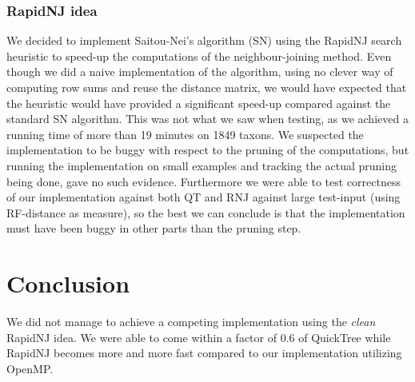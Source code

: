 \documentclass[a4paper,oneside,article,11pt]{memoir}
\begin{document}
\subsection*{RapidNJ idea}
We decided to implement Saitou-Nei's algorithm (SN) using the RapidNJ search heuristic to speed-up the computations of the neighbour-joining method. Even though we did a naive implementation of the algorithm, using no clever way of computing row sums and reuse the distance matrix, we would have expected that the heuristic would have provided a significant speed-up compared against the standard SN algorithm. This was not what we saw when testing, as we achieved a running time of more than 19 minutes on 1849 taxons. We suspected the implementation to be buggy with respect to the pruning of the computations, but running the implementation on small examples and tracking the actual pruning being done, gave no such evidence. Furthermore we were able to test correctness of our implementation against both QT and RNJ against large test-input (using RF-distance as measure), so the best we can conclude is that the implementation must have been buggy in other parts than the pruning step.

\chapter*{Conclusion}
We did not manage to achieve a competing implementation using the \textit{clean} RapidNJ idea. We were able to come within a factor of $0.6$ of QuickTree while RapidNJ becomes more and more fast compared to our implementation utilizing OpenMP.


\end{document}
